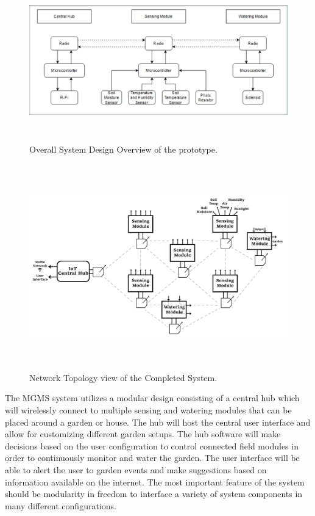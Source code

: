 \documentclass{report}
\begin{document}
\begin{figure}[H] %
    \centering
    \includegraphics[height=2.75in]{PNGs/SystemDesign.PNG}
    \caption{Overall System Design Overview of the prototype.}
    \label{fig:SystemDiagram}
\end{figure}

\begin{figure}[H] %
    \centering
    \includegraphics[height=3.5in]{PNGs/System Diagram.jpg}
    \caption{Network Topology view of the Completed System.}
    \label{fig:NetworkDiagram}
\end{figure}

The MGMS system utilizes a modular design consisting of a central hub which will wirelessly connect to multiple sensing and watering modules that can be placed around a garden or house. The hub will host the central user interface and allow for customizing different garden setups. The hub software will make decisions based on the user configuration to control connected field modules in order to continuously monitor and water the garden. The user interface will be able to alert the user to garden events and make suggestions based on information available on the internet. The most important feature of the system should be modularity in freedom to interface a variety of system components in many different configurations.\\
\end{document}
